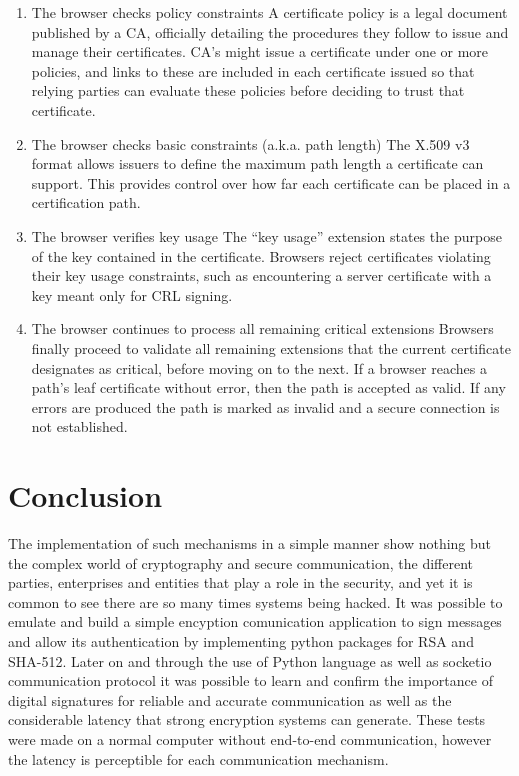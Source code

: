 \documentclass[letterpaper,12pt]{article}
\begin{document}
\begin{enumerate}
\item The browser checks policy constraints
A certificate policy is a legal document published by a CA, officially detailing the procedures they follow to issue and manage their certificates. CA's might issue a certificate under one or more policies, and links to these are included in each certificate issued so that relying parties can evaluate these policies before deciding to trust that certificate.

\item The browser checks basic constraints (a.k.a. path length)
The X.509 v3 format allows issuers to define the maximum path length a certificate can support. This provides control over how far each certificate can be placed in a certification path.

\item The browser verifies key usage
The “key usage” extension states the purpose of the key contained in the certificate. Browsers reject certificates violating their key usage constraints, such as encountering a server certificate with a key meant only for CRL signing.

\item The browser continues to process all remaining critical extensions
Browsers finally proceed to validate all remaining extensions that the current certificate designates as critical, before moving on to the next. If a browser reaches a path’s leaf certificate without error, then the path is accepted as valid. If any errors are produced the path is marked as invalid and a secure connection is not established.

\end{enumerate}




 
\section{Conclusion}
The implementation of such mechanisms in a simple manner show nothing but the complex world of cryptography and secure communication, the different parties, enterprises and entities that play a role in the security, and yet it is common to see there are so many times systems being hacked. It was possible to emulate and build a simple encyption comunication application to sign messages and allow its authentication by implementing python packages for RSA and SHA-512. Later on and through the use of Python language as well as socketio communication protocol it was possible to learn and confirm the importance of digital signatures for reliable and accurate communication as well as the considerable latency that strong encryption systems can generate. 
These tests were made on a normal computer without end-to-end communication, however the latency is perceptible for each communication mechanism. 
\end{document}
